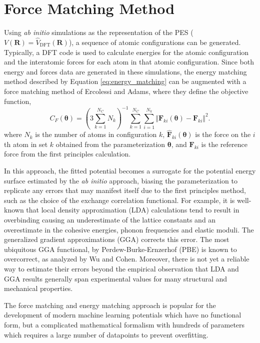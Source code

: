 \section{Force Matching Method}
Using \emph{ab initio} simulations as the representation of the PES ($V(\bm{R})=\hat{V}_{\text{DFT}}(\bm{R})$), a sequence of atomic configurations can be generated.  Typically, a DFT code is used to calculate energies for the atomic configuration and the interatomic forces for each atom in that atomic configuration. Since both energy and forces data are generated in these simulations, the energy matching method described by Equation \ref{eq:energy_matching} can be augmented with a force matching method of Ercolessi and Adams\cite{ercolessi1994_fitting_forcematching}, where they define the objective function,
\begin{equation}
\label{eq:force_matching}
	C_{F}(\bm{\theta}) = \left(3\sum_{k=1}^{N_C} N_k \right)^{-1}
		\sum_{k=1}^{N_C}\sum_{i=1}^{N_k}
			\Vert \hat{\bm{F}}_{ki}(\bm{\theta}) - \bm{F}_{ki}\Vert^2.
\end{equation}
where $N_k$ is the number of atoms in configuration $k$, $\hat{\bm{F}}_{ki}(\bm{\theta})$ is the force on the $i$th atom in set $k$ obtained from the parameterization $\bm{\theta}$, and $\bm{F}_{ki}$ is the reference force from the first principles calculation.

In this approach, the fitted potential becomes a surrogate for the potential energy surface estimated by the \emph{ab initio} approach, biasing the parameterization to replicate any errors that may manifest itself due to the first principles method, such as the choice of the exchange correlation functional.  For example, it is well-known that local density approximation (LDA)\cite{kohn1965_dft} calculations tend to result in overbinding causing an underestimate of the lattice constants and an overestimate in the cohesive energies, phonon frequencies and elastic moduli\cite{vandewalle1999_lda_overbinding}.  The generalized gradient approximations (GGA) corrects this error.  The most ubiquitous GGA functional, by Perdew-Burke-Ernzerhof (PBE)\cite{perdew1996_gga_pbe} is known to overcorrect, as analyzed by Wu and Cohen\cite{wu2006_gga_underbinding}.  Moreover, there is not yet a reliable way to estimate their errors beyond the empirical observation that LDA and GGA results generally span experimental values for many structural and mechanical properties.

The force matching and energy matching approach is popular for the development of modern machine learning potentials which have no functional form, but a complicated mathematical formalism with hundreds of parameters\cite{behler2016_ml_pot} which requires a large number of datapoints to prevent overfitting\cite{wood2018_snap}.

